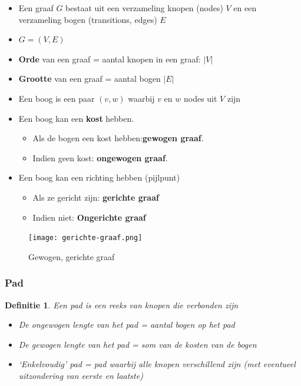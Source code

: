 \documentclass{article}
\newtheorem{theorem}{Definitie}[section]
\begin{document}
\begin{itemize}
    \item Een graaf $G$ bestaat uit een verzameling knopen (nodes) $V$ en een verzameling bogen (transitions, edges) $E$ 
    \item $G = (V, E)$
    \item \textbf{Orde} van een graaf = aantal knopen in een graaf: $|V|$
    \item \textbf{Grootte} van een graaf = aantal bogen $|E|$
    \item Een boog is een paar $(v,w)$ waarbij $v$ en $w$ nodes uit $V$ zijn
    \item Een boog kan een \textbf{kost} hebben. 
    \begin{itemize}
        \item Als de bogen een kost hebben:\textbf{gewogen graaf}. 
        \item Indien geen kost: \textbf{ongewogen graaf}.
    \end{itemize}    
    \item Een boog kan een richting hebben (pijlpunt)
    \begin{itemize}
        \item Als ze gericht zijn: \textbf{gerichte graaf}
        \item Indien niet: \textbf{Ongerichte graaf}
    \end{itemize}
\end{itemize}

\begin{figure}[H]
    \centering
    \texttt{[image: gerichte-graaf.png]}
    \caption{Gewogen, gerichte graaf}
\end{figure}


\subsubsection{Pad}

\begin{theorem}
    Een pad is een reeks van knopen die verbonden zijn

    \begin{itemize}
        \item De ongewogen lengte van het pad = aantal bogen op het pad
        \item De gewogen lengte van het pad = som van de kosten van de bogen
        \item `Enkelvoudig' pad = pad waarbij alle knopen verschillend zijn (met eventueel uitzondering van eerste en laatste)
    \end{itemize}
\end{theorem}
\end{document}
